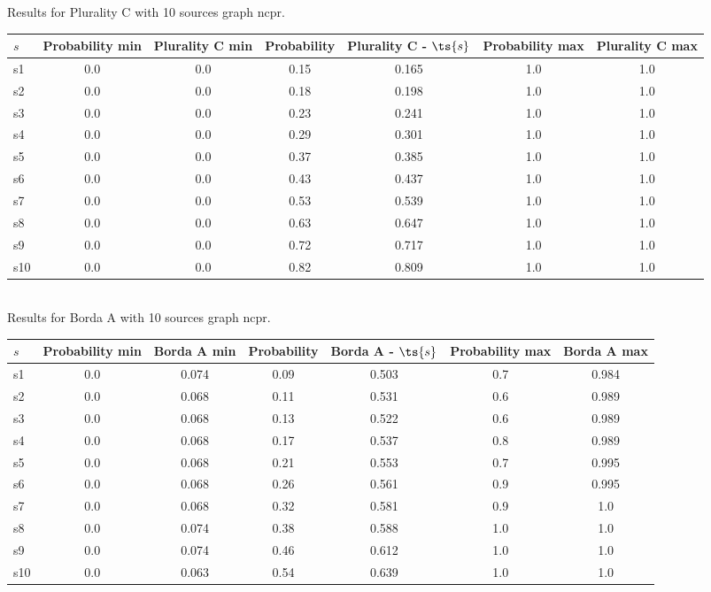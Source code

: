 \documentclass{article}
\begin{document}
\noindent Results for Plurality C with 10 sources graph ncpr.

\noindent\begin{tabular}{|l|c|c|c|c|c|c|}
\hline
$s$& Probability min & Plurality C min & Probability & Plurality C - $\ts{s}$ & Probability max & Plurality C max\\
\hline
s1 &0.0 & 0.0 & 0.15 & 0.165 & 1.0 & 1.0\\
\hline
s2 &0.0 & 0.0 & 0.18 & 0.198 & 1.0 & 1.0\\
\hline
s3 &0.0 & 0.0 & 0.23 & 0.241 & 1.0 & 1.0\\
\hline
s4 &0.0 & 0.0 & 0.29 & 0.301 & 1.0 & 1.0\\
\hline
s5 &0.0 & 0.0 & 0.37 & 0.385 & 1.0 & 1.0\\
\hline
s6 &0.0 & 0.0 & 0.43 & 0.437 & 1.0 & 1.0\\
\hline
s7 &0.0 & 0.0 & 0.53 & 0.539 & 1.0 & 1.0\\
\hline
s8 &0.0 & 0.0 & 0.63 & 0.647 & 1.0 & 1.0\\
\hline
s9 &0.0 & 0.0 & 0.72 & 0.717 & 1.0 & 1.0\\
\hline
s10 &0.0 & 0.0 & 0.82 & 0.809 & 1.0 & 1.0\\
\hline
\end{tabular}\\

\noindent Results for Borda A with 10 sources graph ncpr.

\noindent\begin{tabular}{|l|c|c|c|c|c|c|}
\hline
$s$& Probability min & Borda A min & Probability & Borda A - $\ts{s}$ & Probability max & Borda A max\\
\hline
s1 &0.0 & 0.074 & 0.09 & 0.503 & 0.7 & 0.984\\
\hline
s2 &0.0 & 0.068 & 0.11 & 0.531 & 0.6 & 0.989\\
\hline
s3 &0.0 & 0.068 & 0.13 & 0.522 & 0.6 & 0.989\\
\hline
s4 &0.0 & 0.068 & 0.17 & 0.537 & 0.8 & 0.989\\
\hline
s5 &0.0 & 0.068 & 0.21 & 0.553 & 0.7 & 0.995\\
\hline
s6 &0.0 & 0.068 & 0.26 & 0.561 & 0.9 & 0.995\\
\hline
s7 &0.0 & 0.068 & 0.32 & 0.581 & 0.9 & 1.0\\
\hline
s8 &0.0 & 0.074 & 0.38 & 0.588 & 1.0 & 1.0\\
\hline
s9 &0.0 & 0.074 & 0.46 & 0.612 & 1.0 & 1.0\\
\hline
s10 &0.0 & 0.063 & 0.54 & 0.639 & 1.0 & 1.0\\
\hline
\end{tabular}\\
\end{document}
